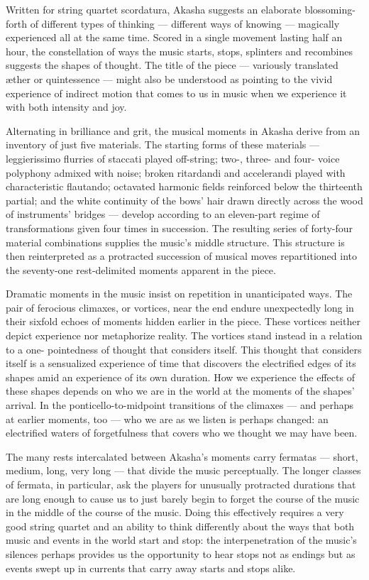 Written for string quartet scordatura, Akasha suggests an elaborate blossoming-forth of different types of thinking — different ways of knowing — magically experienced all at the same time. Scored in a single movement lasting half an hour, the constellation of ways the music starts, stops, splinters and recombines suggests the shapes of thought. The title of the piece — variously translated æther or quintessence — might also be understood as pointing to the vivid experience of indirect motion that comes to us in music when we experience it with both intensity and joy.

Alternating in brilliance and grit, the musical moments in Akasha derive from an inventory of just five materials. The starting forms of these materials — leggierissimo flurries of staccati played off-string; two-, three- and four- voice polyphony admixed with noise; broken ritardandi and accelerandi played with characteristic flautando; octavated harmonic fields reinforced below the thirteenth partial; and the white continuity of the bows’ hair drawn directly across the wood of instruments’ bridges — develop according to an eleven-part regime of transformations given four times in succession. The resulting series of forty-four material combinations supplies the music’s middle structure. This structure is then reinterpreted as a protracted succession of musical moves repartitioned into the seventy-one rest-delimited moments apparent in the piece.

Dramatic moments in the music insist on repetition in unanticipated ways. The pair of ferocious climaxes, or vortices, near the end endure unexpectedly long in their sixfold echoes of moments hidden earlier in the piece. These vortices neither depict experience nor metaphorize reality. The vortices stand instead in a relation to a one- pointedness of thought that considers itself. This thought that considers itself is a sensualized experience of time that discovers the electrified edges of its shapes amid an experience of its own duration. How we experience the effects of these shapes depends on who we are in the world at the moments of the shapes’ arrival. In the ponticello-to-midpoint transitions of the climaxes — and perhaps at earlier moments, too — who we are as we listen is perhaps changed: an electrified waters of forgetfulness that covers who we thought we may have been.

The many rests intercalated between Akasha’s moments carry fermatas — short, medium, long, very long — that divide the music perceptually. The longer classes of fermata, in particular, ask the players for unusually protracted durations that are long enough to cause us to just barely begin to forget the course of the music in the middle of the course of the music. Doing this effectively requires a very good string quartet and an ability to think differently about the ways that both music and events in the world start and stop: the interpenetration of the music’s silences perhaps provides us the opportunity to hear stops not as endings but as events swept up in currents that carry away starts and stops alike.

